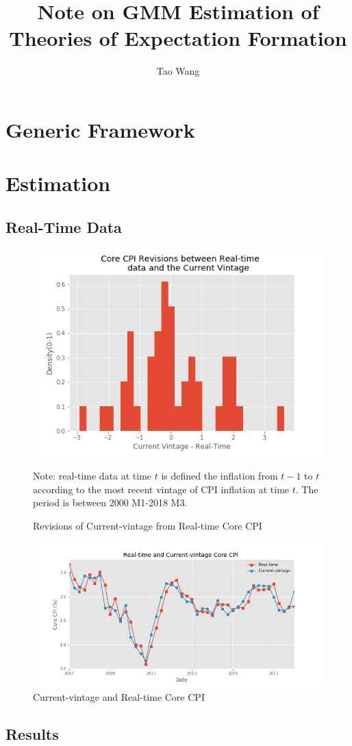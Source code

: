 \documentclass[]{article}
\title{Note on GMM Estimation of Theories of Expectation Formation}
\author{Tao Wang}
\begin{document}
\maketitle

\section{Generic Framework}


\section{Estimation}
\subsection{Real-Time Data}

\begin{figure}
\includegraphics[width=\textwidth]{figures/hist_rev_realtime.png}
\caption{Revisions of Current-vintage from Real-time Core CPI}
\label{real_time_rev}
	\begin{flushleft}
	{\footnotesize Note: real-time data  at time $t$ is defined the inflation from $t-1$ to $t$ according to the most recent vintage of CPI inflation at time $t$. The period is between 2000 M1-2018 M3.}
\end{flushleft}
\end{figure}


\begin{figure}
	\includegraphics[width=\textwidth]{figures/ts_rev_realtime.png}
	\caption{Current-vintage and Real-time Core CPI}
	\label{ts_real_time_current_vintage}
\end{figure}

\subsection{Results}
\end{document}
